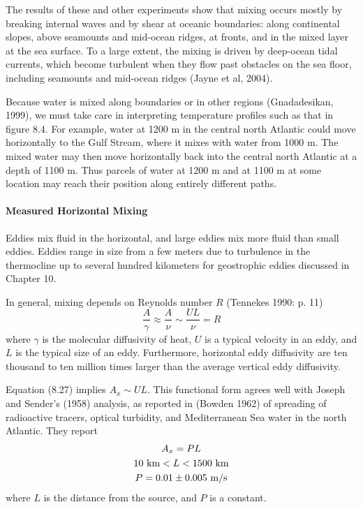 The results of these and other experiments show that mixing occurs
mostly by breaking internal waves and by shear at oceanic boundaries:
along continental slopes, above seamounts and mid-ocean ridges, at
fronts, and in the mixed layer at the sea
surface. To a large extent, the mixing is driven by deep-ocean tidal
currents, which
become turbulent when they flow past obstacles on the sea floor,
including seamounts and mid-ocean ridges (Jayne et al, 2004).

Because water is mixed along boundaries or in other regions
(Gnadadesikan, 1999), we must take care in interpreting temperature
profiles such as that in figure 8.4. For example, water at 1200 m in
the central north Atlantic could move horizontally to the Gulf
Stream, where it mixes with water from
1000 m. The mixed water may then move horizontally back into the
central north Atlantic at a depth of 1100 m. Thus parcels of water at
1200 m and at 1100 m at some location may reach their position along
entirely different paths.

\paragraph{Measured Horizontal Mixing}
 Eddies mix fluid in the
horizontal, and large eddies mix more fluid than small eddies. Eddies
range in size from a few meters due to
turbulence in the
thermocline up to several hundred kilometers for
geostrophic eddies discussed in
Chapter 10.

In general, mixing depends on Reynolds number $R$ (Tennekes 1990:
p. 11)
\begin{equation}
\frac{A}{\gamma} \approx \frac{A}{\nu} \sim \frac{UL}{\nu} = R
\end{equation}
where $\gamma$ is the molecular diffusivity of heat, $U$ is a typical
velocity in an eddy, and $L$ is the typical size of an
eddy. Furthermore, horizontal eddy diffusivity are ten thousand to ten
million times larger than the average vertical eddy diffusivity.

Equation (8.27) implies $A_x\sim UL$. This functional form agrees well
with Joseph and Sender's (1958) analysis, as reported in (Bowden 1962)
of spreading of radioactive tracers, optical turbidity, and
Mediterranean Sea water in the north Atlantic. They report
\begin{gather}
A_x = P L \\
10 \text{ km} < L < 1500 \text{ km} \notag \\
P = 0.01 \pm 0.005 \text{ m/s} \notag
\end{gather}
where $L$ is the distance from the source, and $P$ is a constant.

